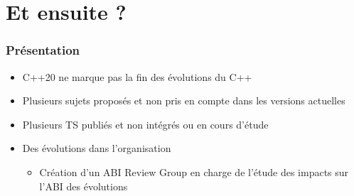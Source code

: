 \documentclass[C++.tex]{subfiles}
\begin{document}
\section{Et ensuite ?}

\begin{frame}
	\frametitle{Présentation}
	\begin{itemize}
		\item C++20 ne marque pas la fin des évolutions du C++
		\item Plusieurs sujets proposés et non pris en compte dans les versions actuelles
		\item Plusieurs TS publiés et non intégrés ou en cours d'étude
		\item Des évolutions dans l'organisation
		\begin{itemize}
			\item Création d'un ABI Review Group en charge de l'étude des impacts sur l'ABI des évolutions
		\end{itemize}
	\end{itemize}
\end{frame}
\end{document}
